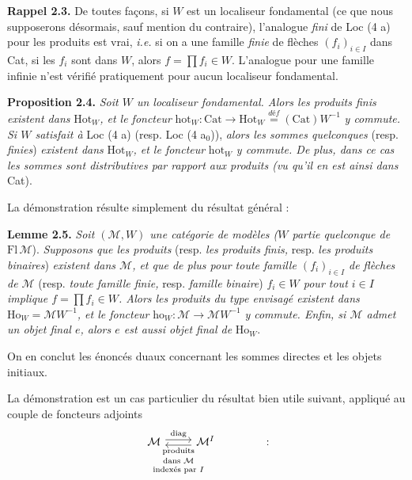 \documentclass[11pt]{article}
\newcommand{\printedpage}[1]{\marginpar{\footnotesize p.~#1}}
\newcommand{\msp}[1]{\marginpar{\footnotesize [#1]}}
\begin{document}
\textbf{Rappel 2.3.} De toutes façons, si $W$ est un localiseur fondamental (ce que nous supposerons désormais, sauf mention du contraire), l'analogue \textit{fini} de Loc (4 a) pour les produits est vrai, \textit{i.e.} si on a une famille \textit{finie} de flèches $(f_i)_{i\in I}$ dans Cat, si les $f_i$ sont dans $W$, alors $f = \prod f_i \in W$. L'analogue pour une famille infinie n'est vérifié pratiquement pour aucun localiseur fondamental.

\msp{page 10}\textbf{Proposition 2.4.} \textit{Soit $W$ un localiseur fondamental. Alors les produits finis existent dans} $\mathrm{Hot}_W$\textit{, et le foncteur} $\mathrm{hot}_W : \mathrm{Cat} \longrightarrow \mathrm{Hot}_W \overset{\textit{déf}}{=} (\mathrm{Cat})W^{-1}$ \textit{y commute. Si $W$ satisfait à} Loc (4 a) (resp. Loc (4 a$_0$)), \textit{alors les sommes quelconques} (resp. \textit{finies}) \textit{existent dans} $\mathrm{Hot}_W$\textit{, et le foncteur} $\mathrm{hot}_W$ \textit{y commute. De plus, dans ce cas les sommes sont distributives par rapport aux produits (vu qu'il en est ainsi dans} Cat).

La démonstration résulte simplement du résultat général :

\textbf{Lemme 2.5.} \textit{Soit $(\mathcal{M}, W)$ une catégorie de modèles ($W$ partie quelconque de} $\mathrm{Fl}\,\mathcal{M}$). \textit{Supposons que les produits} (resp. \textit{les produits finis,} resp. \textit{les produits binaires}) \textit{existent dans $\mathcal{M}$, et que de plus pour toute famille $(f_i)_{i\in I}$ de flèches de $\mathcal{M}$} (resp. \textit{toute famille finie,}
\printedpage{6}
resp. \textit{famille binaire}) \textit{$f_i \in W$ pour tout $i \in I$ implique $f = \prod f_i \in W$. Alors les produits du type envisagé existent dans} $\mathrm{Ho}_W = \mathcal{M}W^{-1}$\textit{, et le foncteur} $\mathrm{ho}_W : \mathcal{M} \longrightarrow \mathcal{M}W^{-1}$ \textit{y commute. Enfin, si $\mathcal{M}$ admet un objet final $e$, alors $e$ est aussi objet final de} $\mathrm{Ho}_W$.



\msp{page 11}On en conclut les énoncés duaux concernant les sommes directes et les objets initiaux.

La démonstration est un cas particulier du résultat bien utile suivant, appliqué au couple de foncteurs adjoints
\[
\begin{tikzcd}
\mathcal{M} \arrow[r, shift left, "\mathrm{diag}"] & \mathcal{M}^I \arrow[l, shift left, "\text{\scriptsize\shortstack{produits\\ dans $\mathcal{M}$\\ indexés par $I$}}"]
\end{tikzcd}
\qquad\qquad :
\]
\end{document}
